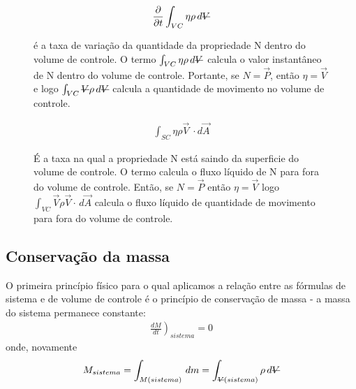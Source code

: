 \documentclass{article}
\newcommand{\stkout}[1]{\ifmmode\text{\sout{\ensuremath{#1}}}\else\sout{#1}\fi}
\begin{document}
\begin{figure}[!h]
  \centering
  \begin{minipage}{0.45\textwidth}
    \begin{align*}
      \frac{\partial}{\partial t} \int_{VC}^{ } \eta \rho \, d\stkout{V}
    \end{align*}
  \end{minipage}\hfill
  \begin{minipage}{0.45\textwidth}
    é a taxa de variação da quantidade da propriedade N dentro do volume de controle. O termo $\int_{VC}^{ } \eta \rho \, d\stkout{V}$  calcula o valor instantâneo de N dentro do volume de controle. Portante, se $N=\vec{P}$, então $\eta = \vec{V}$ e logo $\int_{VC}^{ } \stkout{V} \rho \, d\stkout{V}$ calcula a quantidade de movimento no volume de controle.
  \end{minipage}
\end{figure}

\begin{figure}[!h]
  \centering
  \begin{minipage}{0.45\textwidth}
    \begin{align*}
      \int_{SC}^{ } \eta \rho \vec{V}\ \cdot d\vec{A}
    \end{align*}
  \end{minipage}\hfill
  \begin{minipage}{0.45\textwidth}
    É a taxa na qual a propriedade N está saindo da superficie do volume de controle. O termo calcula o fluxo líquido de N para fora do volume de controle. Então, se $N=\vec{P}$ então $\eta=\vec{V}$ logo $\int_{VC}^{ } \vec{V} \rho \vec{V} \cdot\, d\vec{A}$ calcula o fluxo líquido de quantidade de movimento para fora do volume de controle.
  \end{minipage}
\end{figure}

\subsection{Conservação da massa}
O primeira princípio físico para o qual aplicamos a relação entre as fórmulas de sistema e de volume de controle é o princípio de conservação de massa - a massa do sistema permanece constante:
\begin{align*}
  \left.\frac{dM}{dt}\right)_{sistema}=0
\end{align*}
onde, novamente
\begin{align*}
  M_{sistema}=\int_{M(sistema)}^{ } \, dm = \int_{\stkout{V}(sistema)}^{ } \rho\, d\stkout{V}
\end{align*}
\end{document}
